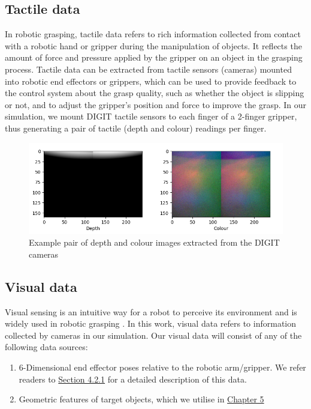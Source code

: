 \documentclass[11pt, a4paper]{report}
\begin{document}
\newpage
\subsection{Tactile data}\label{sec:3.2.1}
In robotic grasping, tactile data refers to rich information collected from contact with a robotic hand or gripper during the manipulation of objects. It reflects the amount of force and pressure applied by the gripper on an object in the grasping process. Tactile data can be extracted from tactile sensors (cameras) mounted into robotic end effectors or grippers, which can be used to provide feedback to the control system about the grasp quality, such as whether the object is slipping or not, and to adjust the gripper's position and force to improve the grasp. In our simulation, we mount DIGIT tactile sensors \cite{Lambeta2020DIGIT} to each finger of a 2-finger gripper, thus generating a pair of tactile (depth and colour) readings per finger.
\begin{figure}[H]
    \centering
    \includegraphics[width=\textwidth]{docs/Project Report/Media/4_2_tactile_data_visualisation.png}
    \caption{Example pair of depth and colour images extracted from the DIGIT cameras}
    \label{fig:3.4}
\end{figure}


\subsection{Visual data}\label{sec:3.2.2}
Visual sensing is an intuitive way for a robot to perceive its environment and is widely used in robotic grasping \cite{GUO2017274}. In this work, visual data refers to information collected by cameras in our simulation. Our visual data will consist of any of the following data sources:
\begin{enumerate}
    \item 6-Dimensional end effector poses relative to the robotic arm/gripper. We refer readers to \hyperref[sec:4.2.1]{Section 4.2.1} for a detailed description of this data.
    \item Geometric features of target objects, which we utilise in \hyperref[chap:5]{Chapter 5}
\end{enumerate}
\end{document}
